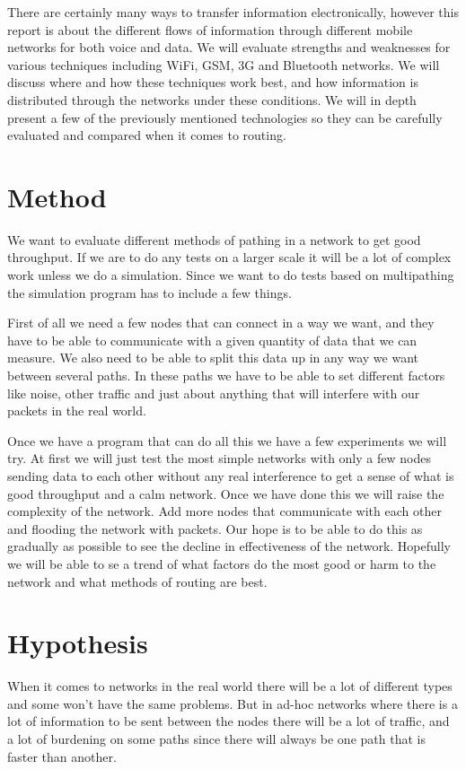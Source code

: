 \documentclass[11pt,twocolumn]{article}
\begin{document}
There are certainly many ways to transfer information electronically, however this report is about the different flows of information through different mobile networks for both voice and data. We will evaluate strengths and weaknesses for various techniques including WiFi, GSM, 3G and Bluetooth networks. We will discuss where and how these techniques work best, and how information is distributed through the networks under these conditions. We will in depth present a few of the previously mentioned technologies so they can be carefully evaluated and compared when it comes to routing.


\section{Method}

We want to evaluate different methods of pathing in a network to get good throughput. If we are to do any tests on a larger scale it will be a lot of complex work unless we do a simulation. Since we want to do tests based on multipathing the simulation program has to include a few things. 

First of all we need a few nodes that can connect in a way we want, and they have to be able to communicate with a given quantity of data that we can measure. We also need to be able to split this data up in any way we want between several paths. In these paths we have to be able to set different factors like noise, other traffic and just about anything that will interfere with our packets in the real world.

Once we have a program that can do all this we have a few experiments we will try. At first we will just test the most simple networks with only a few nodes sending data to each other without any real interference to get a sense of what is good throughput and a calm network. Once we have done this we will raise the complexity of the network. Add more nodes that communicate with each other and flooding the network with packets. Our hope is to be able to do this as gradually as possible to see the decline in effectiveness of the network. Hopefully we will be able to se a trend of what factors do the most good or harm to the network and what methods of routing are best.

\section{Hypothesis}

When it comes to networks in the real world there will be a lot of different types and some won't have the same problems. But in ad-hoc networks where there is a lot of information to be sent between the nodes there will be a lot of traffic, and a lot of burdening on some paths since there will always be one path that is faster than another.
\end{document}
